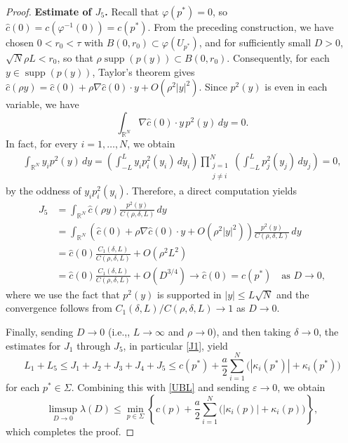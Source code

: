 \documentclass[12pt,reqno]{amsart}
\numberwithin{equation}{section}
\begin{document}
\begin{proof}
\textbf{Estimate of $J_5$.}
Recall that $\varphi({p^*})=0$, so $\hat{c}(0)=c(\varphi^{-1}(0))=c(p^*)$. From the preceding construction, we have chosen \(0<r_0<\tau\) with \(B(0,r_0)\subset\varphi(U_{p^*})\), and for sufficiently small \(D>0\), \(\sqrt N\rho L<r_0\), so that \(\rho\operatorname{supp}(p(y))\subset B(0,r_0)\). Consequently, for each \(y\in\operatorname{supp}(p(y))\), Taylor's theorem gives
$\hat{c}(\rho y)=\hat{c}(0)+\rho\nabla\hat{c}(0)\cdot y+O(\rho^2|y|^2)$. Since \(p^2(y)\) is even in each variable, we have
\[
\int_{\mathbb{R}^N}
\nabla\hat{c}(0)\cdot y\,p^2(y)\,dy
=0.
\]
In fact,  for every \(i=1,\ldots,N\), we obtain
\begin{align*}
\int_{\mathbb{R}^N}y_i p^2(y)\,dy
=
\left(
\int_{-L}^{L}y_i p_i^2(y_i)\,dy_i
\right)
\prod_{\substack{j=1\\ j\neq i}}^N
\left(
\int_{-L}^{L}p_j^2(y_j)\,dy_j
\right)=0,
\end{align*}
by the oddness of \(y_i p_i^2(y_i)\).
Therefore, a direct computation yields
\begin{align*}
J_5
&= \int_{\mathbb{R}^N} \hat{c}(\rho y) \frac{p^2(y)}{C(\rho,\delta,L)} \, dy \\
&= \int_{\mathbb{R}^N} \left( \hat{c}(0) + \rho\nabla\hat{c}(0)\cdot y+O(\rho^2 |y|^2) \right) \frac{p^2(y)}{C(\rho,\delta,L)} \, dy \\
&= \hat{c}(0) \frac{C_1(\delta,L)}{C(\rho,\delta,L)} + O(\rho^2 L^2) \\
&= \hat{c}(0) \frac{C_1(\delta,L)}{C(\rho,\delta,L)} + O(D^{3/4}) \longrightarrow \hat{c}(0) = c(p^*) \quad \text{as } D \to 0,
\end{align*}
where we use the fact that  $p^2(y)$ is supported in $|y|\le L\sqrt N$ and the convergence follows from   \(C_1(\delta,L)/C(\rho,\delta,L)\to 1\)   as \(D\to0\).



Finally, sending $D \to 0$ (i.e.,, $L \to \infty$ and $\rho \to 0$), and then taking $\delta \to 0$, the estimates for $J_1$ through $J_5$, in particular \eqref{J1}, yield
\[
L_1 + L_5 \le J_1 + J_2 + J_3 + J_4 + J_5
\le c(p^*) + \frac{a}{2} \sum_{i=1}^N \bigl(|\kappa_i(p^*)| + \kappa_i(p^*)\bigr)
\]
for each $p^* \in \Sigma$. Combining this with \eqref{UBL} and sending $\varepsilon \to 0$, we obtain
\[
\limsup_{D \to 0} \lambda(D)
\le \min_{p \in \Sigma} \left\{ c(p) + \frac{a}{2} \sum_{i=1}^N \bigl(|\kappa_i(p)| + \kappa_i(p)\bigr) \right\},
\]
which completes the proof.
\end{proof}
\end{document}
